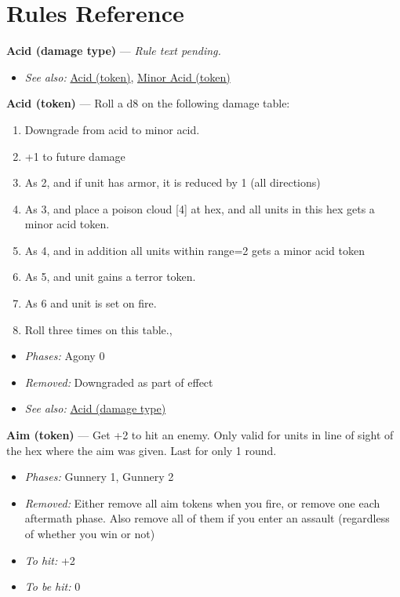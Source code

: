 \documentclass[a4paper,12pt]{article}
\begin{document}
\newpage
\section{Rules Reference}


\label{rule-damage-type-acid}%
\noindent\textbf{Acid (damage type)} --- \textit{Rule text pending.}\begin{itemize}
\item \textit{See also:} \hyperref[rule-token-acid]{Acid (token)}, \hyperref[rule-token-minor-acid]{Minor Acid (token)}
\end{itemize}


\label{rule-token-acid}%
\noindent\textbf{Acid (token)} --- Roll a d8 on the following damage table:
\begin{enumerate}
\item Downgrade from acid to minor acid.
\item +1 to future damage
\item As 2, and if unit has armor, it is reduced by 1 (all directions)
\item As 3, and place a poison cloud [4] at hex, and all units in this hex gets a minor acid token.
\item As 4, and in addition all units within range=2 gets a minor acid token
\item As 5, and unit gains a terror token.
\item As 6 and unit is set on fire.
\item Roll three times on this table.,
\end{enumerate}
\begin{itemize}
\item \textit{Phases:} Agony 0
\item \textit{Removed:} Downgraded as part of effect
\item \textit{See also:} \hyperref[rule-damage-type-acid]{Acid (damage type)}
\end{itemize}


\label{rule-token-aim}%
\noindent\textbf{Aim (token)} --- Get +2 to hit an enemy. Only valid for units in line of sight of the hex where the aim was given. Last for only 1 round.
\begin{itemize}
\item \textit{Phases:} Gunnery 1, Gunnery 2
\item \textit{Removed:} Either remove all aim tokens when you fire, or remove one each aftermath phase. Also remove all of them if you enter an assault (regardless of whether you win or not)
\item \textit{To hit:} +2
\item \textit{To be hit:} 0
\end{itemize}
\end{document}
